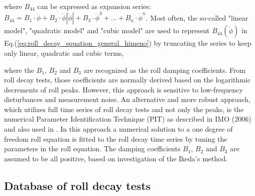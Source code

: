 where $B_{44}$ can be expressed as expansion series:  
$ B_{44} = B_1\cdot\dot{\phi} + B_2\cdot\dot{\phi}\left|\dot{\phi}\right| + B_3\cdot\dot{\phi}^3 + ... + B_n\cdot\dot{\phi}^n$. Most often, the so-called "linear model", "quadratic model" and "cubic model" are used to represent $B_{44}(\dot{\phi})$ in Eq.(\ref{eq:roll_decay_equation_general_himeno}) by truncating the series to keep only linear, quadratic and cubic terms,






where the $B_1$, $B_2$ and $B_3$ are recognized as the roll damping coefficients.
From roll decay tests, those coefficients are normally derived based on the logarithmic decrements of roll peaks. However, this approach is sensitive to low-frequency disturbances and measurement noise. An alternative and more robust approach, which utilizes full time series of roll decay tests and not only the peaks, is the numerical Parameter Identification Technique (PIT) as described in IMO (2006) and also used in \parencite{bulian_simplified_2004}. In this approach a numerical solution to a one degree of freedom roll equation is fitted to the roll decay time series by tuning the parameters in the roll equation. The damping coefficients $B_1$, $B_2$ and $B_3$ are assumed to be all positive, based on investigation of the Ikeda's method.



\subsection{Database of roll decay tests}
\label{se:database_of_roll_decay_tests}


%


%